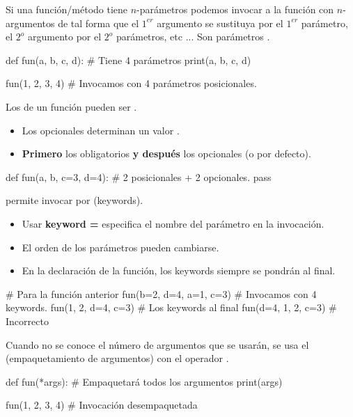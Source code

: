 Si una función/método tiene $n$-parámetros podemos invocar a la función con $n$-argumentos de tal forma que el $1^{er}$ argumento se sustituya por el $1^{er}$ parámetro, el $2^{o}$ argumento por el $2^{o}$ parámetros, etc ... Son parámetros .


\begin{pyverbatim}[][frame=single]
def fun(a, b, c, d):  # Tiene 4 parámetros
    print(a, b, c, d)

fun(1, 2, 3, 4) # Invocamos con 4 parámetros posicionales.
\end{pyverbatim}


Los  de un función pueden ser .
	\begin{itemize}
	\item Los opcionales determinan un valor   . 
	\item \textbf{Primero} los obligatorios \textbf{y después} los opcionales (o por defecto).
	\end{itemize}

\begin{pyverbatim}[][frame=single]
def fun(a, b, c=3, d=4): #  2 posicionales + 2 opcionales.
    pass
\end{pyverbatim}


  permite invocar por  (keywords).
	\begin{itemize}
	\item Usar \textbf{keyword =}  especifica el nombre del parámetro en la invocación.
	\item El orden de los parámetros pueden cambiarse.
	\item En la declaración de la función, los keywords siempre se pondrán al final.
	\end{itemize}

\begin{pyverbatim}[][frame=single]
# Para la función anterior
fun(b=2, d=4, a=1, c=3) # Invocamos con 4 keywords.
fun(1, 2, d=4, c=3) # Los keywords al final
fun(d=4, 1, 2, c=3) # Incorrecto
\end{pyverbatim}



Cuando no se conoce el número de argumentos que se usarán, se usa el   (empaquetamiento de argumentos) con el operador \key{*}.


\begin{pyconsole}[][frame=single]
def fun(*args):   # Empaquetará todos los argumentos
    print(args)

fun(1, 2, 3, 4)   # Invocación desempaquetada
\end{pyconsole}

